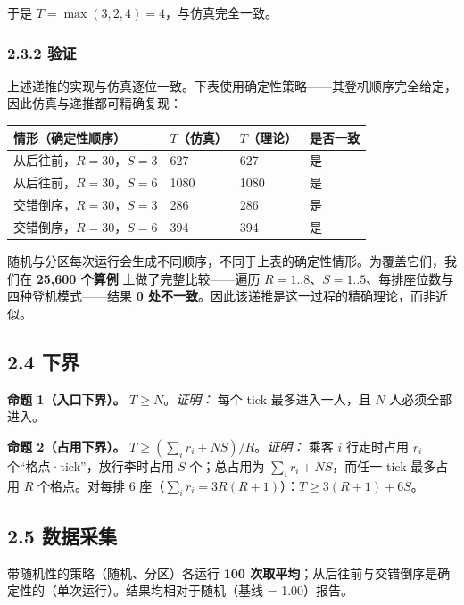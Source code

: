 \documentclass[
  11pt,
  UTF8,
  fontset=windows]{ctexart}
\newcounter{none} %
\begin{document}
于是 \(T=\max(3,2,4)=4\)，与仿真完全一致。

\subsubsection{2.3.2 验证}\label{ux9a8cux8bc1}

上述递推的实现与仿真逐位一致。下表使用确定性策略------其登机顺序完全给定，因此仿真与递推都可精确复现：

{\def\LTcaptype{none} %
\begin{longtable}[]{@{}llll@{}}
\toprule\noalign{}
情形（确定性顺序） & \(T\)（仿真） & \(T\)（理论） & 是否一致 \\
\midrule\noalign{}
\endhead
\bottomrule\noalign{}
\endlastfoot
从后往前，\(R=30\)，\(S=3\) & 627 & 627 & 是 \\
从后往前，\(R=30\)，\(S=6\) & 1080 & 1080 & 是 \\
交错倒序，\(R=30\)，\(S=3\) & 286 & 286 & 是 \\
交错倒序，\(R=30\)，\(S=6\) & 394 & 394 & 是 \\
\end{longtable}
}

随机与分区每次运行会生成不同顺序，不同于上表的确定性情形。为覆盖它们，我们在
\textbf{25,600 个算例} 上做了完整比较------遍历
\(R=1..8\)、\(S=1..5\)、每排座位数与四种登机模式------结果 \textbf{0
处不一致}。因此该递推是这一过程的精确理论，而非近似。

\subsection{2.4 下界}\label{ux4e0bux754c}

\textbf{命题 1（入口下界）。} \(T\ge N\)。\emph{证明：} 每个 tick
最多进入一人，且 \(N\) 人必须全部进入。

\textbf{命题 2（占用下界）。}
\(T\ge\left(\sum_i r_i+N S\right)/R\)。\emph{证明：} 乘客 \(i\)
行走时占用 \(r_i\) 个``格点·tick''，放行李时占用 \(S\) 个；总占用为
\(\sum_i r_i+N S\)，而任一 tick 最多占用 \(R\) 个格点。对每排 6
座（\(\sum_i r_i=3R(R+1)\)）：\(T\ge 3(R+1)+6S\)。

\subsection{2.5 数据采集}\label{ux6570ux636eux91c7ux96c6}

带随机性的策略（随机、分区）各运行 \textbf{100
次取平均}；从后往前与交错倒序是确定性的（单次运行）。结果均相对于随机（基线
= 1.00）报告。
\end{document}
